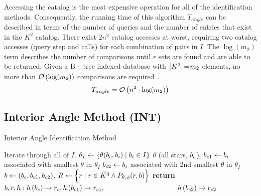 Accessing the catalog is the most expensive operation for all of the identification methods.
Consequently, the running time of this algorithm $T_{angle}$ can be described in terms of the number of queries and
the number of entries that exist in the $K^2$ catalog.
There exist $2n^2$ catalog accesses at worst, requiring two catalog accesses (query step and  calls) for
each combination of pairs in $I$.
The $\log (m_2)$ term describes the number of comparisons until $r$ sets are found and are able to be returned.
Given a B+ tree indexed database with $\left| K^2 \right| \!=\! m_2$ elements, no more than $\mathcal{O} \left( \log(m_2) \right)$
comparisons are required~\cite{patel:advanceTreeStructures}.
\begin{equation}\label{eq:complexityAngle}
    T_{angle} = \bigO\left( n^2 \cdot \log(m_2) \right)
\end{equation}


\subsection{Interior Angle Method (INT)}\label{subsec:interiorAngleMethod}
\begin{algorithm}
    \caption{Interior Angle Identification Method} \label{algorithm:interiorAngleIdentification}
    \begin{algorithmic}[1]
          \Comment Iterate through all of $I$.
        \State $\theta_I \gets \{\theta(b_c, b_i) \mid b_i \in I\}$ \Comment $\theta$
        (all stars, $b_c$).
        \State $b_{c1} \gets b_i$ associated with smallest $\theta$ in $\theta_I$
        \State $b_{c2} \gets b_i$ associated with 2nd smallest $\theta$ in $\theta_I$
        \State $b \gets \left(b_c, b_{c1}, b_{c2}\right)$, $R \gets \left\{  r \mid r \in \bar{K^3} \land
        P_{\theta, \phi}(r, b)  \right\}$
        \State \textbf{return} $b, r, h: h\left(b_c\right) \rightarrow r_c, h\left(b_{c1}\right)
        \rightarrow r_{c1},$
        \State \ \ \ \ \ \ \ \ \ \ \ \ \ \  \ \ \ \ \ \ $h\left(b_{c2}\right) \rightarrow r_{c2}$
        \EndIf
        \EndFor
        \EndFunction
    \end{algorithmic}
\end{algorithm}

